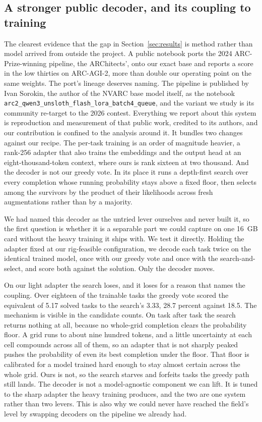 \documentclass[11pt]{article}
\begin{document}
\subsection{A stronger public decoder, and its coupling to training}
\label{sec:architects}
The clearest evidence that the gap in Section~\ref{sec:results} is method rather than model arrived from
outside the project. A public notebook ports the 2024 ARC-Prize-winning pipeline, the ARChitects', onto our
exact base and reports a score in the low thirties on ARC-AGI-2, more than double our operating point on the
same weights. The port's lineage deserves naming. The pipeline is published by Ivan Sorokin, the author of
the NVARC base model itself, as the notebook \texttt{arc2\_qwen3\_unsloth\_flash\_lora\_batch4\_queue}, and
the variant we study is its community re-target to the 2026 contest. Everything we report about this system
is reproduction and measurement of that public work, credited to its authors, and our contribution is
confined to the analysis around it. It bundles two changes against our recipe. The per-task training is an order of magnitude
heavier, a rank-256 adapter that also trains the embeddings and the output head at an eight-thousand-token
context, where ours is rank sixteen at two thousand. And the decoder is not our greedy vote. In its place it
runs a depth-first search over every completion whose running probability stays above a fixed floor, then
selects among the survivors by the product of their likelihoods across fresh augmentations rather than by a
majority.

We had named this decoder as the untried lever ourselves and never built it, so the first question is whether
it is a separable part we could capture on one 16~GB card without the heavy training it ships with. We test it
directly. Holding the adapter fixed at our rig-feasible configuration, we decode each task twice on the
identical trained model, once with our greedy vote and once with the search-and-select, and score both against
the solution. Only the decoder moves.

On our light adapter the search loses, and it loses for a reason that names the coupling. Over eighteen of the
trainable tasks the greedy vote scored the equivalent of 5.17 solved tasks to the search's 3.33, 28.7 percent
against 18.5. The mechanism is visible in the candidate counts. On task after task the search returns nothing
at all, because no whole-grid completion clears the probability floor. A grid runs to about nine hundred
tokens, and a little uncertainty at each cell compounds across all of them, so an adapter that is not sharply
peaked pushes the probability of even its best completion under the floor. That floor is calibrated for a model
trained hard enough to stay almost certain across the whole grid. Ours is not, so the search starves and
forfeits tasks the greedy path still lands. The decoder is not a model-agnostic component we can lift. It is
tuned to the sharp adapter the heavy training produces, and the two are one system rather than two levers. This
is also why we could never have reached the field's level by swapping decoders on the pipeline we already had.
\end{document}
